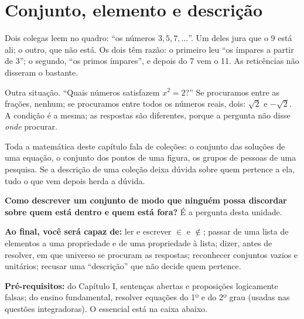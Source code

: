 \clearpage
\section{Conjunto, elemento e descrição}

\Prefacio
\begin{prefacio}

Dois colegas leem no quadro: \enquote{os números $3, 5, 7, \ldots$}. Um deles jura que o 9 está ali; o outro, que não está. Os dois têm razão: o primeiro leu \enquote{os ímpares a partir de 3}; o segundo, \enquote{os primos ímpares}, e depois do 7 vem o 11. As reticências não disseram o bastante.

Outra situação. \enquote{Quais números satisfazem $x^2=2$?} Se procuramos entre as frações, nenhum; se procuramos entre todos os números reais, dois: $\sqrt2$ e $-\sqrt2$. A condição é a mesma; as respostas são diferentes, porque a pergunta não disse \emph{onde} procurar.

Toda a matemática deste capítulo fala de coleções: o conjunto das soluções de uma equação, o conjunto dos pontos de uma figura, os grupos de pessoas de uma pesquisa. Se a descrição de uma coleção deixa dúvida sobre quem pertence a ela, tudo o que vem depois herda a dúvida.

\textbf{Como descrever um conjunto de modo que ninguém possa discordar sobre quem está dentro e quem está fora?} É a pergunta desta unidade.

\textbf{Ao final, você será capaz de:} ler e escrever $\in$ e $\notin$; passar de uma lista de elementos a uma propriedade e de uma propriedade à lista; dizer, antes de resolver, em que universo se procuram as respostas; reconhecer conjuntos vazios e unitários; recusar uma \enquote{descrição} que não decide quem pertence.

\textbf{Pré-requisitos:} do Capítulo I, sentenças abertas e proposições logicamente falsas; do ensino fundamental, resolver equações do 1º e do 2º grau (usadas nas questões integradoras). O essencial está na caixa abaixo.
\end{prefacio}

